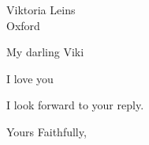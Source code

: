 \documentclass{MyLetter}
\begin{document}
\begin{letter}{Viktoria Leins \\ Oxford}
\opening{My darling Viki}

I love you

I look forward to your reply.

\closing{Yours Faithfully,}

\end{letter}
\end{document}
